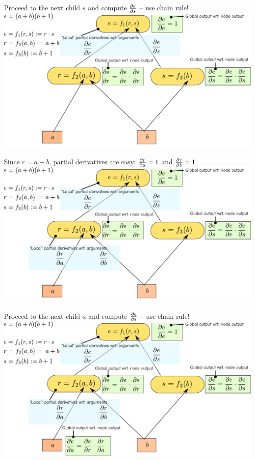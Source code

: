 \documentclass[12pt,aspectratio=169]{beamer}
\begin{document}
\begin{frame}{Proceed to the next child $s$ and compute $\pdv{e}{s}$ -- use chain rule!}
	\includegraphics[width=1.2\linewidth]{img/backprop06.pdf}
\end{frame}

\begin{frame}{Since $r = a + b$, partial derivatives are easy: $\pdv{r}{a} = 1$ and $\pdv{r}{b} = 1$}
	\includegraphics[width=1.2\linewidth]{img/backprop07.pdf}
\end{frame}

\begin{frame}{Proceed to the next child $a$ and compute $\pdv{e}{a}$ -- use chain rule!}
	\includegraphics[width=1.2\linewidth]{img/backprop08.pdf}
\end{frame}
\end{document}
